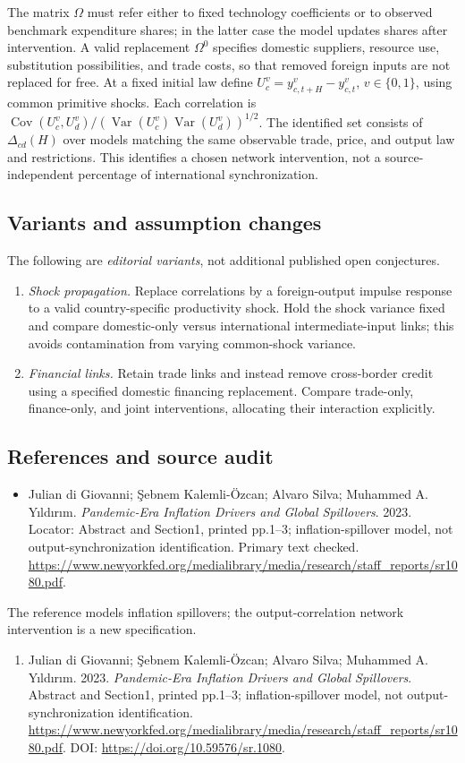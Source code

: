 \documentclass[11pt,a4paper]{article}
\begin{document}
The matrix \(\Omega\) must refer either to fixed technology coefficients or to observed benchmark expenditure shares; in the latter case the model updates shares after intervention. A valid replacement \(\Omega^0\) specifies domestic suppliers, resource use, substitution possibilities, and trade costs, so that removed foreign inputs are not replaced for free. At a fixed initial law define \(U_c^v=y_{c,t+H}^v-y_{c,t}^v\), \(v\in\{0,1\}\), using common primitive shocks. Each correlation is \(\operatorname{Cov}(U_c^v,U_d^v)/(\operatorname{Var}(U_c^v)\operatorname{Var}(U_d^v))^{1/2}\). The identified set consists of \(\Delta_{cd}(H)\) over models matching the same observable trade, price, and output law and restrictions. This identifies a chosen network intervention, not a source-independent percentage of international synchronization.
\subsection*{Variants and assumption changes}
The following are \emph{editorial variants}, not additional published open conjectures.
\begin{enumerate}
\item \emph{Shock propagation.} Replace correlations by a foreign-output impulse response to a valid country-specific productivity shock. Hold the shock variance fixed and compare domestic-only versus international intermediate-input links; this avoids contamination from varying common-shock variance.
\item \emph{Financial links.} Retain trade links and instead remove cross-border credit using a specified domestic financing replacement. Compare trade-only, finance-only, and joint interventions, allocating their interaction explicitly.
\end{enumerate}
\subsection*{References and source audit}
\begin{itemize}
\item Julian di Giovanni; \c{S}ebnem Kalemli-\"{O}zcan; Alvaro Silva; Muhammed A. Y\i{}ld\i{}r\i{}m. \emph{Pandemic-Era Inflation Drivers and Global Spillovers}. 2023. Locator: Abstract and Section1, printed pp.1--3; inflation-spillover model, not output-synchronization identification. Primary text checked. \url{https://www.newyorkfed.org/medialibrary/media/research/staff_reports/sr1080.pdf}.
\end{itemize}
The reference models inflation spillovers; the output-correlation network intervention is a new specification.
\begin{enumerate}\raggedright
\item\hypertarget{definitions:source:30007519:1}{} Julian di Giovanni; \c{S}ebnem Kalemli-\"{O}zcan; Alvaro Silva; Muhammed A. Y\i{}ld\i{}r\i{}m. 2023. \emph{Pandemic-Era Inflation Drivers and Global Spillovers}. Abstract and Section1, printed pp.1--3; inflation-spillover model, not output-synchronization identification.
\url{https://www.newyorkfed.org/medialibrary/media/research/staff_reports/sr1080.pdf}.
DOI: \url{https://doi.org/10.59576/sr.1080}.
\end{enumerate}
\end{document}
